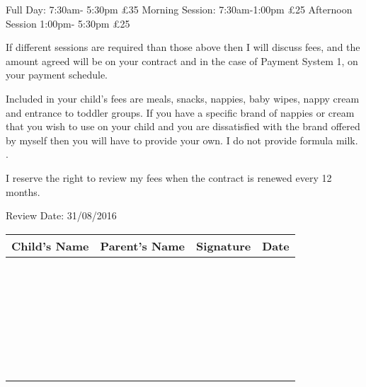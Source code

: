 Full Day: 7:30am- 5:30pm £35
Morning Session: 7:30am-1:00pm £25
Afternoon Session 1:00pm- 5:30pm £25

If different sessions are required than those above then I will discuss fees, and the amount agreed will be on your contract and in the case of Payment System 1, on your payment schedule.

Included in your child's fees are meals, snacks, nappies, baby wipes, nappy cream and entrance to toddler groups. If you have a specific brand of nappies or cream that you wish to use on your child and you are dissatisfied with the brand offered by myself then you will have to provide your own. I do not provide formula milk. . 

I reserve the right to review my fees when the contract is renewed every 12 months.

Review Date: 31/08/2016

\begin{table}[h]
  \def\arraystretch{2.0}
  \begin{tabularx}{\textwidth}{!{\color{gray}\vrule}X!{\color{gray}\vrule}X!{\color{gray}\vrule}X!{\color{gray}\vrule}X!{\color{gray}\vrule}}
    \hline
    Child's Name & Parent's Name & Signature & Date \\
    \hline
    ~ & ~ & ~ & \\
    \hline
    ~ & ~ & ~ & \\
    \hline
    ~ & ~ & ~ & \\
    \hline
    ~ & ~ & ~ & \\
    \hline
    ~ & ~ & ~ & \\
    \hline
    ~ & ~ & ~ & \\
    \hline
  \end{tabularx}
\end{table}




